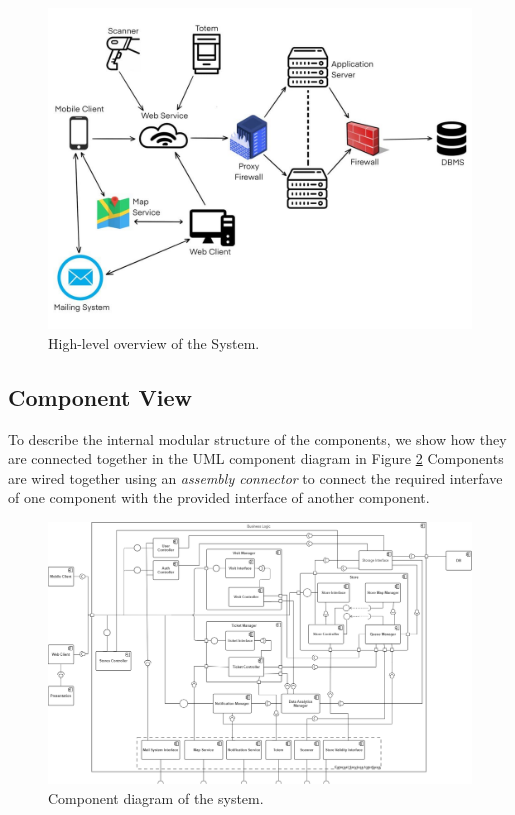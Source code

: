 \documentclass[a4paper, 12pt, oneside, table]{article}
\begin{document}
\begin{figure}[h!]
\centering
	\centering
  	\includegraphics[height=0.4\textheight, scale=0.3, keepaspectratio]{img/high_level_overview.jpg}
	\caption{High-level overview of the System.}
 	\label{high_level_overview_img}
\end{figure}

\subsection{Component View}
To describe the internal modular structure of the components, we show how they are connected together in the UML component diagram in Figure \ref{comp_view_img} Components are wired together using an \textit{assembly connector} to connect the required interfave of one component with the provided interface of another component.

\begin{figure}[hbt]
\centering
	\centering
  	\includegraphics[height=0.4\textheight, scale=0.2, keepaspectratio]{img/component_view.png}
	\caption{Component diagram of the system.}
 	\label{comp_view_img}
\end{figure}
\end{document}
